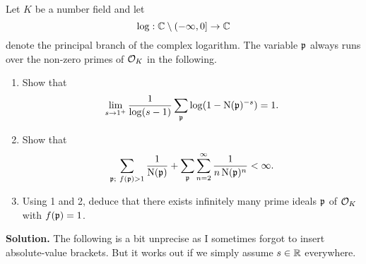 \documentclass[a4paper,11pt]{article}
\begin{document}
Let $K$ be a number field and let 
\begin{equation*}
    \log: \mathbb{C} \setminus (-\infty, 0] \to \mathbb{C}
\end{equation*}
denote the principal branch of the complex logarithm. The variable $\mathfrak{p}$ always
runs over the non-zero primes of $\mathcal{O}_K$ in the following.
\begin{enumerate}
    \item Show that 
        \begin{equation*}
            \lim_{s \rightarrow 1^+} \frac{1}{\log(s-1)} \sum_{\mathfrak{p}} \log (1 - \operatorname{N}(\mathfrak{p})^{-s}) = 1.
        \end{equation*}
    \item Show that 
        \begin{equation*}
            \sum_{\mathfrak{p};\ f(\mathfrak{p})>1} \frac 1{\operatorname{N}(\mathfrak{p})} + \sum_{\mathfrak{p}} \sum_{n=2}^\infty \frac 1{n \operatorname{N}(\mathfrak{p})^n} < \infty.
        \end{equation*}
    \item Using 1 and 2, deduce that there exists infinitely many prime ideals $\mathfrak{p}$ of $\mathcal{O}_K$ with 
        $f(\mathfrak{p})=1$. 
\end{enumerate}
\textbf{Solution.}
The following is a bit unprecise as I sometimes forgot to insert absolute-value
brackets. But it works out if we simply assume $s \in \mathbb{R}$ everywhere.
\end{document}
